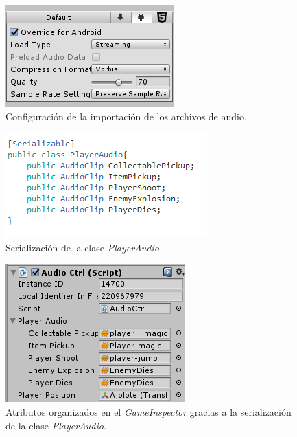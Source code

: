     \begin{figure}[h]
        \centering
        \includegraphics[height=0.15 \textheight]{03TrabajoRealizado/imagenes/playerAudioConfig.png}
        \caption{Configuración de la importación de los archivos de audio.}
        \label{fig:AudioClipConfi}
    \end{figure}

    \begin{figure}[h]
        \centering
        \includegraphics[height=0.15 \textheight]{03TrabajoRealizado/imagenes/playerAudio.png}
        \caption{Serialización de la clase \textit{PlayerAudio}}
        \label{fig:PlayerAudio}
    \end{figure}


    \begin{figure}[h]
        \centering
        \includegraphics[height=0.1 \textheight]{03TrabajoRealizado/imagenes/audioCtrlGameInsp.png}
        \caption{Atributos organizados en el \textit{GameInspector} gracias a la serialización de la clase \textit{PlayerAudio}.}
        \label{fig:PlayerAudioConf}
    \end{figure}

